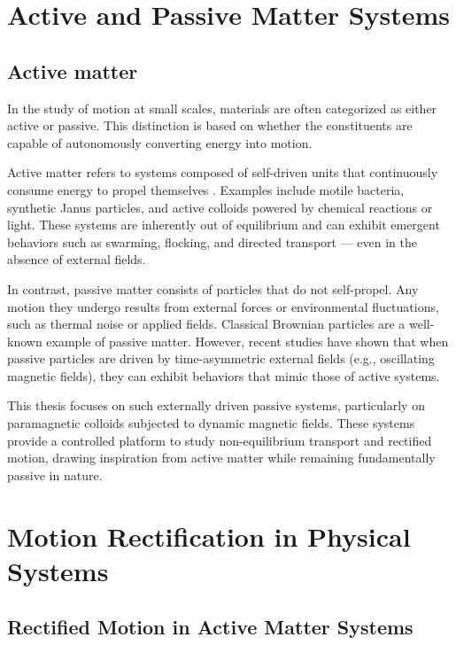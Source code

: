 \chapter{Active and Passive Matter Systems}
\label{ch:activeandpassivemattersystems}

\section{Active matter}

In the study of motion at small scales, materials are often categorized as either active or passive. This distinction is based on whether the constituents are capable of autonomously converting energy into motion.

Active matter refers to systems composed of self-driven units that continuously consume energy to propel themselves \cite{marchetti2013hydrodynamics, bechinger2016active}. Examples include motile bacteria, synthetic Janus particles, and active colloids powered by chemical reactions or light. These systems are inherently out of equilibrium and can exhibit emergent behaviors such as swarming, flocking, and directed transport — even in the absence of external fields.

In contrast, passive matter consists of particles that do not self-propel. Any motion they undergo results from external forces or environmental fluctuations, such as thermal noise or applied fields. Classical Brownian particles are a well-known example of passive matter. However, recent studies have shown that when passive particles are driven by time-asymmetric external fields (e.g., oscillating magnetic fields), they can exhibit behaviors that mimic those of active systems.

This thesis focuses on such externally driven passive systems, particularly on paramagnetic colloids subjected to dynamic magnetic fields. These systems provide a controlled platform to study non-equilibrium transport and rectified motion, drawing inspiration from active matter while remaining fundamentally passive in nature.

\chapter{Motion Rectification in Physical Systems}
\label{ch:motionrectificationinphysicalsystems}

\section{Rectified Motion in Active Matter Systems}

